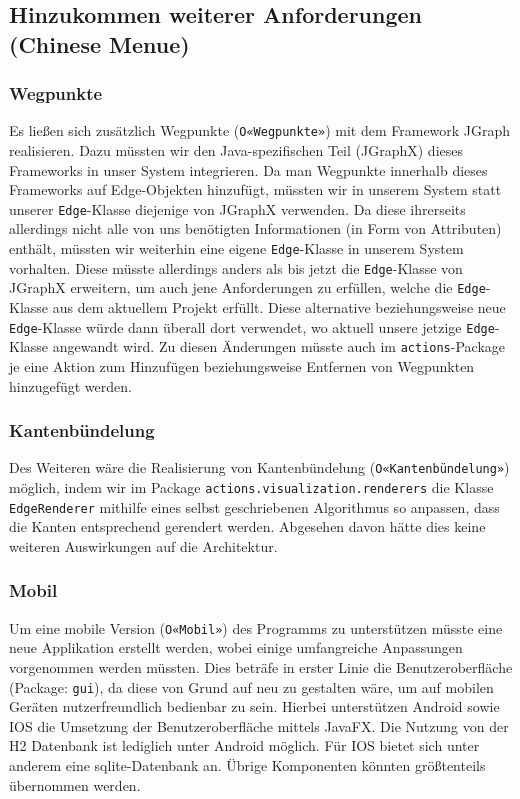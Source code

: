 \documentclass[enabledeprecatedfontcommands,fontsize=11pt,paper=a4,twoside]{scrartcl}
\newcounter{one}
\begin{document}
\subsection{Hinzukommen weiterer Anforderungen (Chinese Menue)}
\subsubsection{Wegpunkte}
Es ließen sich zusätzlich Wegpunkte (\texttt{O«Wegpunkte»}) mit dem Framework JGraph realisieren. Dazu müssten wir den Java-spezifischen Teil (JGraphX) dieses Frameworks in unser System integrieren. Da man Wegpunkte innerhalb dieses Frameworks auf Edge-Objekten hinzufügt, müssten wir in unserem System statt unserer \texttt{Edge}-Klasse diejenige von JGraphX verwenden. Da diese ihrerseits allerdings nicht alle von uns benötigten Informationen (in Form von Attributen) enthält, müssten wir weiterhin eine eigene \texttt{Edge}-Klasse in unserem System vorhalten. Diese müsste allerdings anders als bis jetzt die \texttt{Edge}-Klasse von JGraphX erweitern, um auch jene Anforderungen zu erfüllen, welche die \texttt{Edge}-Klasse aus dem aktuellem Projekt erfüllt. Diese alternative beziehungsweise neue \texttt{Edge}-Klasse würde dann überall dort verwendet, wo aktuell unsere jetzige \texttt{Edge}-Klasse angewandt wird. Zu diesen Änderungen müsste auch im \texttt{actions}-Package je eine Aktion zum Hinzufügen beziehungsweise Entfernen von Wegpunkten hinzugefügt werden. \\

\subsubsection{Kantenbündelung}
Des Weiteren wäre die Realisierung von Kantenbündelung (\texttt{O«Kantenbündelung»}) möglich, indem wir im Package \texttt{actions.visualization.renderers} die Klasse \texttt{EdgeRenderer} mithilfe eines selbst geschriebenen Algorithmus so anpassen, dass die Kanten entsprechend gerendert werden. Abgesehen davon hätte dies keine weiteren Auswirkungen auf die Architektur.  \\

\subsubsection{Mobil}
Um eine mobile Version (\texttt{O«Mobil»}) des Programms zu unterstützen müsste eine neue Applikation erstellt werden, wobei einige umfangreiche Anpassungen vorgenommen werden müssten. Dies beträfe in erster Linie die Benutzeroberfläche (Package: \texttt{gui}), da diese von Grund auf neu zu gestalten wäre, um auf mobilen Geräten nutzerfreundlich bedienbar zu sein. Hierbei unterstützen Android sowie IOS die Umsetzung der Benutzeroberfläche mittels JavaFX. Die Nutzung von der H2 Datenbank ist lediglich unter Android möglich. Für IOS bietet sich unter anderem eine sqlite-Datenbank an. Übrige Komponenten könnten größtenteils übernommen werden. 
\end{document}
